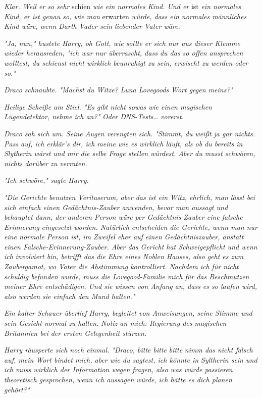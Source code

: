{\emph{Klar. Weil er so sehr} schien \emph{wie ein normales Kind. Und er} ist \emph{ein normales Kind, er ist genau so, wie man} erwarten \emph{würde, dass ein normales männliches Kind wäre, wenn Darth Vader sein liebender Vater wäre.}

\emph{"Ja, nun," hustete Harry, oh Gott, wie sollte er sich nur aus dieser Klemme wieder herausreden, "ich war nur überrascht, dass du das so offen ansprechen wolltest, du schienst nicht wirklich beunruhigt zu sein, erwischt zu werden oder so."}

\emph{Draco schnaubte. "Machst du Witze?} \emph{\emph{Luna Lovegoods}} \emph{Wort gegen meins?"}

\emph{Heilige Scheiße am Stiel. "Es gibt nicht sowas wie einen magischen} \emph{Lügendetektor, nehme ich an?"} \emph{\emph{Oder DNS-Tests… vorerst.}}

\emph{Draco sah sich um. Seine Augen verengten sich. "Stimmt, du weißt ja gar nichts. Pass auf, ich erklär's dir, ich meine wie es wirklich läuft, als ob du bereits in Slytherin wärst und mir die selbe Frage stellen würdest. Aber du musst schwören, nichts darüber zu verraten.}

\emph{"Ich schwöre," sagte Harry.}

\emph{"Die Gerichte benutzen Veritaserum, aber das ist ein Witz, ehrlich, man lässt bei sich einfach einen Gedächtnis-Zauber anwenden, bevor man aussagt und behauptet dann, der anderen Person wäre per Gedächtnis-Zauber eine falsche Erinnerung eingesetzt worden. Natürlich entscheiden die Gerichte, wenn man nur eine normale Person ist, im Zweifel eher auf einen Gedächtniszauber, anstatt einen Falsche-Erinnerung-Zauber. Aber das Gericht hat Schweigepflicht und wenn} \emph{\emph{ich}} \emph{involviert bin, betrifft das die Ehre eines Noblen Hauses, also geht es zum Zaubergamot, wo Vater die Abstimmung kontrolliert. Nachdem ich für nicht schuldig befunden wurde, muss die Lovegood-Familie mich für das Beschmutzen meiner Ehre entschädigen. Und sie wissen von Anfang an, dass es so laufen wird, also werden sie einfach den Mund halten."}

\emph{Ein kalter Schauer überlief Harry, begleitet von Anweisungen, seine Stimme und sein Gesicht normal zu halten.} \emph{\emph{Notiz an mich: Regierung des magischen Britannien bei der ersten Gelegenheit stürzen.}}

\emph{Harry räusperte sich noch einmal. "Draco, bitte bitte} \emph{\emph{bitte}} \emph{nimm das nicht falsch auf, mein Wort bindet mich, aber wie du sagtest, ich könnte in Syltherin sein und ich muss wirklich der Information wegen fragen, also was würde passieren} \emph{\emph{theoretisch gesprochen,}} \emph{wenn ich aussagen} \emph{\emph{würde,}} \emph{ich hätte es dich planen gehört?"}

}
